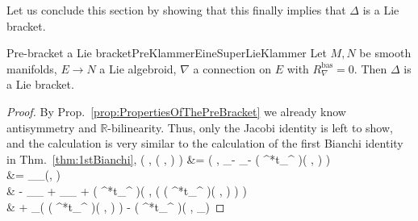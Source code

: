 Let us conclude this section by showing that this finally implies that $\Delta$ is a Lie bracket.

\begin{theorems}{Pre-bracket a Lie bracket}{PreKlammerEineSuperLieKlammer}
Let $M, N$ be smooth manifolds, $E \to N$ a Lie algebroid, $\nabla$ a connection on $E$ with $R^{\mathrm{bas}}_\nabla=0$. Then $\Delta$ is a Lie bracket.
\end{theorems}

\begin{proof}
\leavevmode\newline
By Prop.~\ref{prop:PropertiesOfThePreBracket} we already know antisymmetry and $\mathbb{R}$-bilinearity. 
Thus, only the Jacobi identity is left to show, and the calculation is very similar to the calculation of the first Bianchi identity in Thm.~\ref{thm:1stBianchi},
\bas
\Delta\mleft( \eta, \Delta\mleft( \vartheta, \varepsilon \mright) \mright)
&=
\Delta\mleft( \eta, \delta_\varepsilon \vartheta - \delta_\vartheta \varepsilon - \bigl( {}^*t_{\nabla^{}} \bigr)\mleft( \vartheta, \varepsilon \mright) \mright)
\\
&=
	_{\delta_{\Delta(\vartheta, \varepsilon)} \eta}
\\
&\hspace{1cm}
	- \delta_\eta \delta_\varepsilon \vartheta
	+ \delta_\eta \delta_\vartheta \varepsilon
	+ \bigl( {}^*t_{\nabla^{}} \bigr)\mleft( \eta, \mleft( \bigl( {}^*t_{\nabla^{}} \bigr)\mleft( \vartheta, \varepsilon \mright) \mright) \mright)
\\
&\hspace{1cm}
	+ \delta_\eta \mleft( \bigl( {}^*t_{\nabla^{}} \bigr)\mleft( \vartheta, \varepsilon \mright) \mright)
	- \bigl( {}^*t_{\nabla^{}} \bigr)\mleft( \eta, \delta_\varepsilon \vartheta \mright)

\end{proof}
